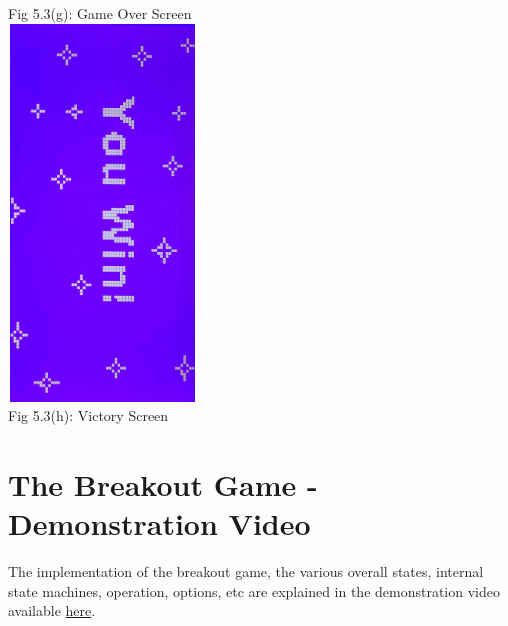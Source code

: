 \documentclass[a4paper,12pt,oneside]{book}
\begin{document}
\begin{center}
{\small Fig 5.3(g): Game Over Screen} \\
\includegraphics[width=5cm, height=10cm, angle  = 90]{BreakoutImages/victoryScreen} \\
{\small Fig 5.3(h): Victory Screen} \\
\end{center}
\section{The Breakout Game - Demonstration Video}
\qquad The implementation of the breakout game, the various overall states, internal state machines, operation, options, etc are explained in the demonstration video available \href{https://youtu.be/RmcoHzYo_G8}{here}. 
\end{document}
